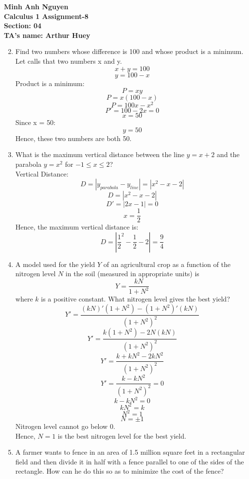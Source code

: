 \documentclass[12pt]{article}
\begin{document}
\textbf{Minh Anh Nguyen }\\
\textbf{Calculus 1 Assignment-8}\\
\textbf{Section: 04}\\
\textbf{TA's name: Arthur Huey}

\hrulefill

\begin{enumerate}
\setcounter{enumi}{1}
    \item Find two numbers whose difference is 100 and whose product is a minimum.\\
    Let calls that two numbers x and y.
    \[x + y = 100\]
    \[y = 100 - x\]
    Product is a minimum:
    \[P = xy\]
    \[P = x(100-x)\]
    \[P = 100x - x^2\]
    \[P' = 100 - 2x = 0\]
    \[x = 50\]
    Since x = 50:
    \[y = 50\]
    Hence, these two numbers are both 50.
    \setcounter{enumi}{4}
    \item What is the maximum vertical distance between the line \(y=x+2\) and the parabola \(y=x^2\) for $-1 \leq x \leq 2$?\\
    Vertical Distance:
    \[D = |y_{parabola} - y_{line}| = |x^2-x-2|\]
    \[D = |x^2-x-2|\]
    \[D' = |2x-1| = 0\]
    \[x = \frac{1}{2}\]
    Hence, the maximum vertical distance is:
    \[D = |\frac{1}{2}^2 - \frac{1}{2} - 2| =  \frac{9}{4}\]
    \setcounter{enumi}{8}
    \item A model used for the yield $Y$ of an agricultural crop as a function of the nitrogen level $N$ in the soil (measured in appropriate units) is
    \[Y = \frac{kN}{1+N^2}\]
    where $k$ is a positive constant. What nitrogen level gives the best yield?
    \[Y' = \frac{(kN)'(1+N^2) - (1+N^2)'(kN)}{(1+N^2)^2}\]
    \[Y' = \frac{k(1+N^2) - 2N(kN)}{(1+N^2)^2}\]
    \[Y' = \frac{k+kN^2 - 2kN^2}{(1+N^2)^2}\]
    \[Y' = \frac{k -kN^2}{(1+N^2)^2} = 0\]
    \[k-kN^2 = 0\]
    \[kN^2 = k\]
    \[N^2 = 1\]
    \[N = \pm 1\]
    Nitrogen level cannot go below 0.\\
    Hence, $N = 1$ is the best nitrogen level for the best yield.
    \setcounter{enumi}{12}
    \item A farmer wants to fence in an area of 1.5 million square feet in a rectangular field and then divide it in half with a fence parallel to one of the sides of the rectangle. How can he do this so as to minimize the cost of the fence?\\
    

\end{enumerate}
\end{document}
